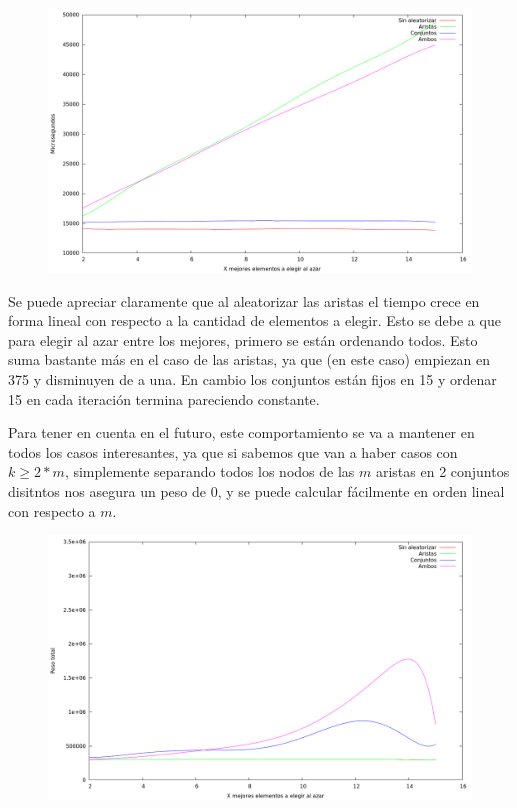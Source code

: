 \begin{figure}[h]
  \begin{center}
    \includegraphics[scale=0.35]{imagenes/grasp-goloso-x-tiempo.png}
  \end{center}
\end{figure}

\vspace*{0.5cm}

Se puede apreciar claramente que al aleatorizar las aristas el tiempo crece
en forma lineal con respecto a la cantidad de elementos a elegir. Esto se debe
a que para elegir al azar entre los mejores, primero se están ordenando todos.
Esto suma bastante más en el caso de las aristas, ya que (en este caso)
empiezan en 375 y disminuyen de a una. En cambio los conjuntos están fijos en
15 y ordenar 15 en cada iteración termina pareciendo constante.

Para tener en cuenta en el futuro, este comportamiento se va a mantener en
todos los casos interesantes, ya que si sabemos que van a haber casos con
$k \geq 2*m$, simplemente separando todos los nodos de las $m$ aristas en 2
conjuntos disitntos nos asegura un peso de 0, y se puede calcular fácilmente
en orden lineal con respecto a $m$.

\vspace*{0.5cm}

\begin{figure}[h]
  \begin{center}
    \includegraphics[scale=0.35]{imagenes/grasp-goloso-x-peso.png}
  \end{center}
\end{figure}

